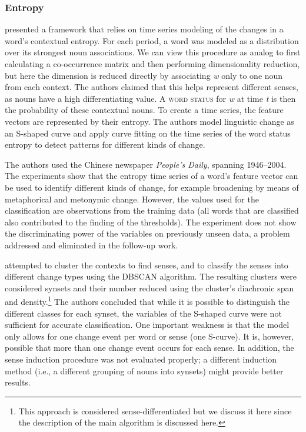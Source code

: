 \documentclass[output=paper]{langsci/langscibook}
\begin{document}
\subsubsection{Entropy}
\citet{tang2013} presented a framework that relies on time series modeling of the changes in a word's contextual entropy. 
For each period, a word was modeled as a distribution over its strongest noun associations. 
We can view this procedure as analog to first calculating a co-occurrence matrix and then performing dimensionality reduction, but here the dimension is reduced directly by associating \textit{w} only to one noun from each context. The authors claimed that this helps represent different senses, as nouns have a high differentiating value.
%
A \textsc{word status} for \textit{w} at time \textit{t} is then the probability of these contextual nouns. 
To create a time series, the feature vectors are represented by their entropy. The authors model linguistic change as an S-shaped curve \citep{kroch_1989} and apply curve fitting on the time series of the word status entropy 
 to detect patterns for different kinds of change. 

The authors used the Chinese newspaper \emph{People's Daily}, spanning 1946--2004. 
The experiments show that the entropy time series of a word's feature vector can be used to identify different kinds of change, for example broadening by means of metaphorical and metonymic change. However, the values used for the classification are observations from the training data (all words that are classified also contributed to the finding of the thresholds). The experiment does not show the discriminating power of the  
variables on previously unseen data, a problem addressed and eliminated in the follow-up work. 

\citet{tang2016} attempted to cluster the contexts to find senses, and to classify the senses into different change types using the DBSCAN algorithm. The resulting clusters were considered synsets and their number reduced using the cluster's diachronic span and density.\footnote{This approach is considered sense-differentiated but we discuss it here since the description of the main algorithm is discussed here.} 
The authors concluded that while it is possible to distinguish the different classes for each synset, the variables of the S-shaped curve were not sufficient for accurate classification. 
One important weakness is that the model only allows for one change event per word or sense (one S-curve). It is, however, possible that more than one change event occurs for each sense. In addition, the sense induction procedure was not evaluated properly; a different induction method (i.e., a different grouping of nouns into synsets) might provide better results. 
\end{document}
